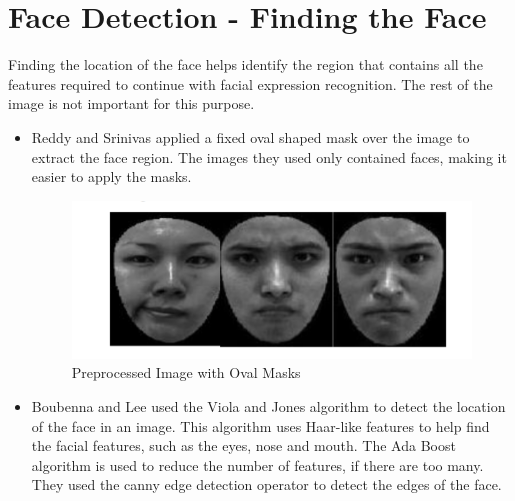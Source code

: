 \section{Face Detection - Finding the Face  }

Finding the location of the face helps identify the region that contains all the features required to continue with facial expression recognition. The rest of the image is not important for this purpose.
\begin{itemize}
\item Reddy and Srinivas applied a fixed oval shaped mask over the image to extract the face region\cite{12}. The images they used only contained faces, making it easier to apply the masks.

\begin{figure}[ht]
  \centering
  \includegraphics[scale=0.4]{6}
  \caption{Preprocessed Image with Oval Masks}
\end{figure}

\item Boubenna and Lee used the Viola and Jones algorithm to detect the location of the face in an image\cite{viola}. This algorithm uses Haar-like features to help find the facial features, such as the eyes, nose and mouth. The Ada Boost algorithm is used to reduce the number of features, if there are too many. They used the canny edge detection operator to detect the edges of the face\cite{3}.
\end{itemize}


